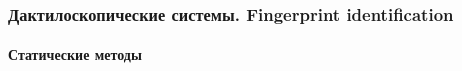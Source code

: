 \begin{frame}[allowframebreaks]
\frametitle{Дактилоскопические системы. Fingerprint identification}
\framesubtitle{Статические методы}

\begin{figure}
    \begin{center}
    \end{center}
\end{figure} 


\end{frame}
